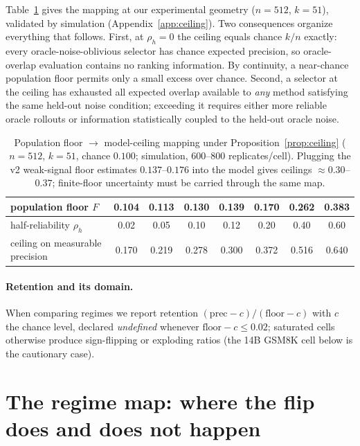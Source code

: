 \documentclass[11pt]{article}
\begin{document}
Table~\ref{tab:ceiling} gives the mapping at our experimental geometry
($n{=}512$, $k{=}51$), validated by simulation (Appendix~\ref{app:ceiling}).
Two consequences organize everything that follows. First, at $\rho_h=0$ the
ceiling equals chance $k/n$ exactly: every oracle-noise-oblivious selector has
chance expected precision, so oracle-overlap evaluation contains no ranking
information. By continuity, a near-chance population floor permits only a
small excess over chance. Second, a selector at the ceiling has exhausted all
expected overlap available to \emph{any} method satisfying the same held-out
noise condition; exceeding it requires either more reliable oracle rollouts
or information statistically coupled to the held-out oracle noise.

\begin{table}[t]
\centering
\caption{Population floor $\to$ model-ceiling mapping under
Proposition~\ref{prop:ceiling}
($n{=}512$, $k{=}51$, chance $0.100$; simulation, 600--800 replicates/cell).
Plugging the v2 weak-signal floor estimates $0.137$--$0.176$ into the model
gives ceilings ${\approx}0.30$--$0.37$; finite-floor uncertainty must be
carried through the same map.}
\label{tab:ceiling}
\begin{tabular}{lccccccc}
\toprule
population floor $F$ & 0.104 & 0.113 & 0.130 & 0.139 & 0.170 & 0.262 & 0.383\\
\midrule
half-reliability $\rho_h$ & 0.02 & 0.05 & 0.10 & 0.12 & 0.20 & 0.40 & 0.60\\
ceiling on measurable precision & 0.170 & 0.219 & 0.278 & 0.300 & 0.372 & 0.516 & 0.640\\
\bottomrule
\end{tabular}
\end{table}

\paragraph{Retention and its domain.} When comparing regimes we report
retention $(\mathrm{prec}-c)/(\mathrm{floor}-c)$ with $c$ the chance level,
declared \emph{undefined} whenever $\mathrm{floor}-c\le 0.02$; saturated cells
otherwise produce sign-flipping or exploding ratios (the 14B GSM8K cell below
is the cautionary case).

\section{The regime map: where the flip does and does not happen}
\label{sec:map}
\end{document}
